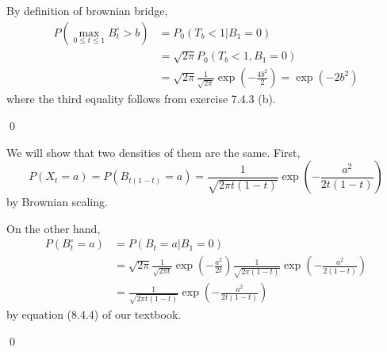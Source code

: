 \begin{problem}[8.4.1] \hfill

	By definition of brownian bridge,
	\[
		\begin{split}
			P\left( \max_{0 \le t \le 1} B_t ^\circ > b \right)
			&=  P_0(T_b < 1 \lvert B_1 = 0) \\
			&=  \sqrt{2\pi} P_0 \left( T_b <1, B_1 = 0 \right) \\
			&= \sqrt{2\pi} \frac{1}{\sqrt{2\pi}}\exp\left( -\frac{4b^2}{2} \right) = \exp(-2b^2)
		\end{split}
	\]
	where the third equality follows from exercise 7.4.3 (b).

	\qed
\end{problem}

\begin{problem}[8.4.2] \hfill

	We will show that two densities of them are the same.
	First,
	\[
		P\left( X_t = a \right) 
		= P\left( B_{t(1-t)} = a \right)
		= \frac{1}{\sqrt{2\pi t(1-t)}}\exp\left( -\frac{a^2}{2t(1-t)} \right)
	\]
	by Brownian scaling.

	On the other hand,
	\[
		\begin{split}
			P\left( B_t^\circ = a \right)
			&= P(B_t = a \lvert B_1 = 0) \\
			&= \sqrt{2\pi} \frac{1}{\sqrt{2\pi t}}\exp\left( -\frac{a^2}{2t} \right) \frac{1}{\sqrt{2\pi(1-t)}}\exp\left( -\frac{a^2}{2(1-t)} \right) \\
			&= \frac{1}{\sqrt{2\pi t(1-t)}} \exp\left( -\frac{a^2}{2t(1-t)} \right)
		\end{split}
	\]
	by equation (8.4.4) of our textbook.

	\qed
\end{problem}
